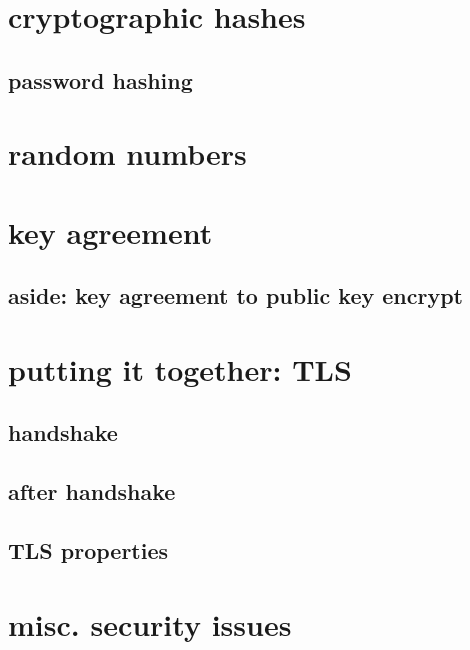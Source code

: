 \section{cryptographic hashes}



\subsection{password hashing}



\section{random numbers}


\section{key agreement}



\subsection{aside: key agreement to public key encrypt}


\section{putting it together: TLS}

\subsection{handshake}


\subsection{after handshake}


\subsection{TLS properties}


\section{misc. security issues}

